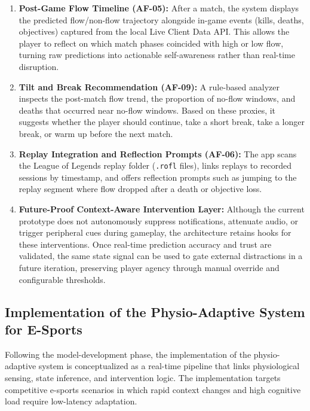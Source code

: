 \begin{enumerate}
    \item \textbf{Post-Game Flow Timeline (AF-05):} After a match, the system displays the predicted flow/non-flow trajectory alongside in-game events (kills, deaths, objectives) captured from the local Live Client Data API. This allows the player to reflect on which match phases coincided with high or low flow, turning raw predictions into actionable self-awareness rather than real-time disruption.

    \item \textbf{Tilt and Break Recommendation (AF-09):} A rule-based analyzer inspects the post-match flow trend, the proportion of no-flow windows, and deaths that occurred near no-flow windows. Based on these proxies, it suggests whether the player should continue, take a short break, take a longer break, or warm up before the next match.

    \item \textbf{Replay Integration and Reflection Prompts (AF-06):} The app scans the League of Legends replay folder (\texttt{.rofl} files), links replays to recorded sessions by timestamp, and offers reflection prompts such as jumping to the replay segment where flow dropped after a death or objective loss.

    \item \textbf{Future-Proof Context-Aware Intervention Layer:} Although the current prototype does not autonomously suppress notifications, attenuate audio, or trigger peripheral cues during gameplay, the architecture retains hooks for these interventions. Once real-time prediction accuracy and trust are validated, the same state signal can be used to gate external distractions in a future iteration, preserving player agency through manual override and configurable thresholds.
\end{enumerate}



\subsection{Implementation of the Physio-Adaptive System for E-Sports}
Following the model-development phase, the implementation of the physio-adaptive system is conceptualized as a real-time pipeline that links physiological sensing, state inference, and intervention logic. The implementation targets competitive e-sports scenarios in which rapid context changes and high cognitive load require low-latency adaptation.


